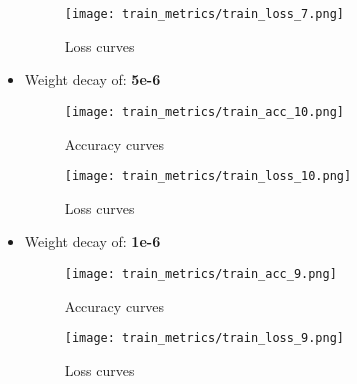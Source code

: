 \documentclass{article}
\begin{document}
\begin{itemize}
\begin{figure}[H]
\begin{minipage}{.5\linewidth}
    \end{minipage}%
    \begin{minipage}{.5\textwidth}
      \centering
      \texttt{[image: train\_metrics/train\_loss\_7.png]}
      \vspace{-1.0em}
      \caption{Loss curves}

    \end{minipage}
    \end{figure}
    
    \newpage
    \item Weight decay of: \textbf{5e-6}
    \begin{figure}[H]
    \centering
    \begin{minipage}{.5\linewidth}
        \centering
        \texttt{[image: train\_metrics/train\_acc\_10.png]}
        \vspace{-1.0em}
        \caption{Accuracy curves}

    \end{minipage}%
    \begin{minipage}{.5\textwidth}
      \centering
      \texttt{[image: train\_metrics/train\_loss\_10.png]}
      \vspace{-1.0em}
      \caption{Loss curves}

    \end{minipage}
    \end{figure}
    
    \item Weight decay of: \textbf{1e-6}
    \begin{figure}[H]
    \centering
    \begin{minipage}{.5\linewidth}
        \centering
        \texttt{[image: train\_metrics/train\_acc\_9.png]}
        \vspace{-1.0em}
        \caption{Accuracy curves}

    \end{minipage}%
    \begin{minipage}{.5\textwidth}
      \centering
      \texttt{[image: train\_metrics/train\_loss\_9.png]}
      \vspace{-1.0em}
      \caption{Loss curves}

    \end{minipage}
    \end{figure}
    
\end{itemize}
\end{document}
